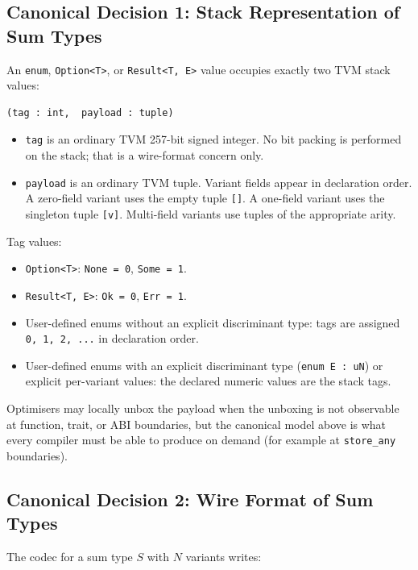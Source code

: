 \documentclass[12pt,oneside]{article}
\begin{document}
\subsection{Canonical Decision 1: Stack Representation of Sum Types}
\label{sec:cd-stack-enum}
An \verb|enum|, \verb|Option<T>|, or \verb|Result<T, E>| value occupies
exactly two TVM stack values:

\begin{verbatim}
(tag : int,  payload : tuple)
\end{verbatim}

\begin{itemize}
\item \verb|tag| is an ordinary TVM 257-bit signed integer. No bit packing is
performed on the stack; that is a wire-format concern only.
\item \verb|payload| is an ordinary TVM tuple. Variant fields appear in
declaration order. A zero-field variant uses the empty tuple \verb|[]|.
A one-field variant uses the singleton tuple \verb|[v]|. Multi-field
variants use tuples of the appropriate arity.
\end{itemize}

Tag values:

\begin{itemize}
\item \verb|Option<T>|: \verb|None = 0|, \verb|Some = 1|.
\item \verb|Result<T, E>|: \verb|Ok = 0|, \verb|Err = 1|.
\item User-defined enums without an explicit discriminant type: tags are
assigned \verb|0, 1, 2, ...| in declaration order.
\item User-defined enums with an explicit discriminant type
(\verb|enum E : uN|) or explicit per-variant values: the declared numeric
values are the stack tags.
\end{itemize}

Optimisers may locally unbox the payload when the unboxing is not observable
at function, trait, or ABI boundaries, but the canonical model above is what
every compiler must be able to produce on demand (for example at
\verb|store_any| boundaries).

\subsection{Canonical Decision 2: Wire Format of Sum Types}
\label{sec:cd-wire-enum}
The codec for a sum type $S$ with $N$ variants writes:
\end{document}
